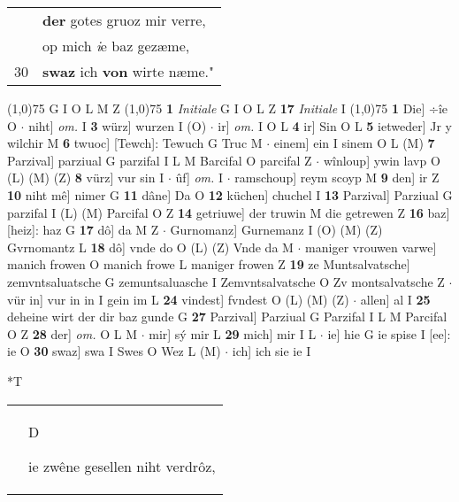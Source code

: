 \documentclass[8pt,a4paper,notitlepage]{article}
\begin{document}
\begin{table}[ht]
\begin{minipage}[t]{0.5\linewidth}
\begin{tabular}{rl}
 & \textbf{der} gotes gruoz mir verre,\\ 
 & op mich \textit{i}e baz gezæme,\\ 
30 & \textbf{swaz} ich \textbf{von} wirte næme."\\ 
\end{tabular}
\scriptsize
\line(1,0){75} \newline
G I O L M Z \newline
\line(1,0){75} \newline
\textbf{1} \textit{Initiale} G I O L Z  \textbf{17} \textit{Initiale} I  \newline
\line(1,0){75} \newline
\textbf{1} Die] ÷îe O  $\cdot$ niht] \textit{om.} I \textbf{3} würz] wurzen I (O)  $\cdot$ ir] \textit{om.} I O L \textbf{4} ir] Sin O L \textbf{5} ietweder] Jr y wilchir M \textbf{6} twuoc] [Tewch]: Tewuch G Truc M  $\cdot$ einem] ein I sinem O L (M) \textbf{7} Parzival] parziual G parzifal I L M Barcifal O parcifal Z  $\cdot$ wînloup] ywin lavp O (L) (M) (Z) \textbf{8} vürz] vur sin I  $\cdot$ ûf] \textit{om.} I  $\cdot$ ramschoup] reym scoyp M \textbf{9} den] ir Z \textbf{10} niht mê] nimer G \textbf{11} dâne] Da O \textbf{12} küchen] chuchel I \textbf{13} Parzival] Parziual G parzifal I (L) (M) Parcifal O Z \textbf{14} getriuwe] der truwin M die getrewen Z \textbf{16} baz] [heiz]: haz G \textbf{17} dô] da M Z  $\cdot$ Gurnomanz] Gurnemanz I (O) (M) (Z) Gvrnomantz L \textbf{18} dô] vnde do O (L) (Z) Vnde da M  $\cdot$ maniger vrouwen varwe] manich frowen O manich frowe L maniger frowen Z \textbf{19} ze Muntsalvatsche] zemvntsaluatsche G zemuntsaluasche I Zemvntsalvatsche O Zv montsalvatsche Z  $\cdot$ vür in] vur in in I gein im L \textbf{24} vindest] fvndest O (L) (M) (Z)  $\cdot$ allen] al I \textbf{25} deheine wirt der dir baz gunde G \textbf{27} Parzival] Parziual G Parzifal I L M Parcifal O Z \textbf{28} der] \textit{om.} O L M  $\cdot$ mir] sý mir L \textbf{29} mich] mir I L  $\cdot$ ie] hie G ie spise I [ee]: ie O \textbf{30} swaz] swa I Swes O Wez L (M)  $\cdot$ ich] ich sie ie I \newline
\end{minipage}
\hspace{0.5cm}
\begin{minipage}[t]{0.5\linewidth}
\small
\begin{center}*T
\end{center}
\begin{tabular}{rl}
 & \begin{large}D\end{large}ie zwêne gesellen niht verdrôz,\\ 

\end{tabular}
\end{minipage}
\end{table}
\end{document}
